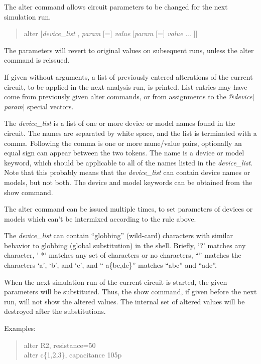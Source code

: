 The {\cb alter} command allows circuit parameters to be changed for
the next simulation run.
\begin{quote}\vt
alter [{\it device\_list\/} , {\it param} [{\vt =}] {\it value\/}
  [{\it param} [{\vt =}]  {\it value\/} ... ]]
\end{quote}
The parameters will revert to original values on subsequent runs,
unless the {\cb alter} command is reissued.

If given without arguments, a list of previously entered alterations
of the current circuit, to be applied in the next analysis run, is
printed.  List entries may have come from previously given {\cb alter}
commands, or from assignments to the {\vt @}{\it device\/}{\vt [}{\it
param\/}{\vt ]} special vectors.

The {\it device\_list} is a list of one or more device or model names
found in the circuit.  The names are separated by white space, and the
list is terminated with a comma.  Following the comma is one or more
name/value pairs, optionally an equal sign can appear between the two
tokens.  The name is a device or model keyword, which should be
applicable to all of the names listed in the {\it device\_list}.  Note
that this probably means that the {\it device\_list} can contain
device names or models, but not both.  The device and model keywords
can be obtained from the {\cb show} command.

The {\cb alter} command can be issued multiple times, to set
parameters of devices or models which can't be intermixed according to
the rule above.

The {\it device\_list} can contain ``globbing'' (wild-card)
characters with similar behavior to globbing (global substitution) in
the {\WRspice} shell.  Briefly, `{\vt ?}' matches any character, '{\vt
*}' matches any set of characters or no characters, ``{\vt [abc]}''
matches the characters `{\vt a}', `{\vt b}', and `{\vt c}', and ``{\vt
a}\{{\vt bc,de}\}'' matches ``{\vt abc}'' and ``{\vt ade}''.

When the next simulation run of the current circuit is started, the
given parameters will be substituted.  Thus, the {\cb show} command,
if given before the next run, will not show the altered values.  The
internal set of altered values will be destroyed after the
substitutions.

Examples:
\begin{quote}
{\vt alter R2, resistance=50}\\
{\vt alter c\{1,2,3\}, capacitance 105p}
\end{quote}

